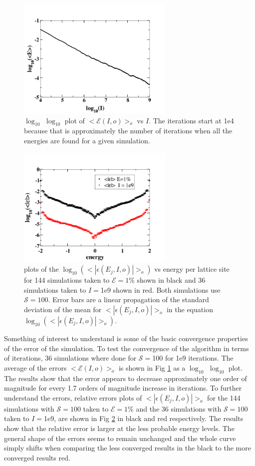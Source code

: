 \documentclass[aps,prl,reprint,superscriptaddress,showkeys]{revtex4-1}
\begin{document}
\begin{figure}
\includegraphics[width=7.5cm]{long_time_error.png}
\caption{\label{log_t_err}$\log_{10}$ $\log_{10}$ plot of $<\mathcal{E}(I,o)>_o$ vs $I$.  The iterations start at 1e4 because that is approximately the number of iterations when all the energies are found for a given simulation. }
\end{figure}
\begin{figure}
\includegraphics[width=7.5cm]{relative_errors.png}
\caption{\label{rel_errors}plots of the $\log_{10}(<|\epsilon(E_j,I,o)|>_o )$ vs  energy per lattice site for 144 simulations taken to $\mathcal{E}=1\%$ shown in black and  36 simulations taken to $I=$1e9 shown in red. Both simulations use $\mathcal{S}=100$. Error bars are a linear propagation of the standard deviation of the mean for $<|\epsilon(E_j,I,o)|>_o$ in the equation $\log_{10}(<|\epsilon(E_j,I,o)|>_o )$. }
\end{figure}
Something of interest to understand is some of the basic convergence properties of the error of the simulation. To test the convergence of the algorithm in terms of iterations,  36 simulations where done for  $\mathcal{S}=$100 for 1e9 iterations. The average of the errors $<\mathcal{E}(I,o)>_o$ is shown in Fig \ref{log_t_err}  as a $\log_{10}$ $\log_{10}$  plot. The results show that the error appears to decrease approximately one order of magnitude for every 1.7 orders of magnitude increase in iterations.  To further understand the errors, relative errors plots of $<|\epsilon(E_j,I,o)|>_o$ for the 144 simulations with $\mathcal{S}=100$ taken to $\mathcal{E}=1\%$ and the 36 simulations with $\mathcal{S}=100$ taken to $I=$1e9,  are shown in Fig \ref{rel_errors} in black and red respectively. The results show that the relative error is larger at the less probable energy levels. The general shape of the errors seems to remain unchanged and the whole curve simply shifts when comparing the less converged results in the black to the more converged results red. 
\end{document}
